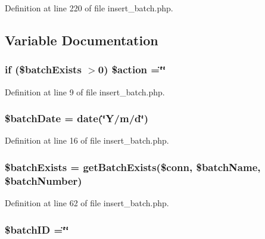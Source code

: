 Definition at line 220 of file insert\-\_\-batch.\-php.



\subsection{Variable Documentation}
\hypertarget{insert__batch_8php_ad1f5a0905b3483329061c134a074ed4c}{
\subsubsection[{\$action}]{\setlength{\rightskip}{0pt plus 5cm}if (\$batch\-Exists $>$0) \$action =\char`\"{}\char`\"{}}}\label{insert__batch_8php_ad1f5a0905b3483329061c134a074ed4c}


Definition at line 9 of file insert\-\_\-batch.\-php.

\hypertarget{insert__batch_8php_a93afdd8e66e69e182754fff598ebf16b}{
\subsubsection[{\$batch\-Date}]{\setlength{\rightskip}{0pt plus 5cm}\$batch\-Date = date(\char`\"{}Y/m/d\char`\"{})}}\label{insert__batch_8php_a93afdd8e66e69e182754fff598ebf16b}


Definition at line 16 of file insert\-\_\-batch.\-php.

\hypertarget{insert__batch_8php_afccc8a9380f3ccdc91175a89f48e5474}{
\subsubsection[{\$batch\-Exists}]{\setlength{\rightskip}{0pt plus 5cm}\$batch\-Exists = {\bf get\-Batch\-Exists}(\$conn, \${\bf batch\-Name}, \$batch\-Number)}}\label{insert__batch_8php_afccc8a9380f3ccdc91175a89f48e5474}


Definition at line 62 of file insert\-\_\-batch.\-php.

\hypertarget{insert__batch_8php_aaa6d122ea9cb55b210aadd86e5654a74}{
\subsubsection[{\$batch\-I\-D}]{\setlength{\rightskip}{0pt plus 5cm}\${\bf batch\-I\-D} =\char`\"{}\char`\"{}}}\label{insert__batch_8php_aaa6d122ea9cb55b210aadd86e5654a74}


